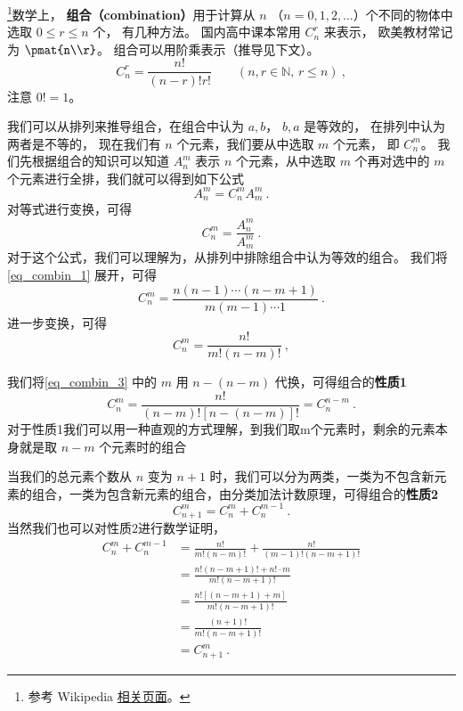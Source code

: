 
\begin{issues}
\issueDraft
\end{issues}


\footnote{参考 Wikipedia \href{https://en.wikipedia.org/wiki/Combination}{相关页面}。}数学上， \textbf{组合（combination）}用于计算从 $n$ （$n = 0, 1, 2, \dots$）个不同的物体中选取 $0 \leqslant r \leqslant n$ 个， 有几种方法。 国内高中课本常用 $C_n^r$ 来表示， 欧美教材常记为 $\pmat{n\\r}$。 组合可以用阶乘表示（推导见下文）。
\begin{equation}
C_n^r = \frac{n!}{(n-r)!r!} \qquad (n, r \in \mathbb N,\, r \leqslant n)~,
\end{equation}
注意 $0! = 1$。

我们可以从排列来推导组合，在组合中认为 ${a,b}$， ${b,a}$ 是等效的， 在排列中认为两者是不等的， 现在我们有 $n$ 个元素，我们要从中选取 $m$ 个元素， 即 $C_n^m$。
我们先根据组合的知识可以知道 $A_n^m$ 表示 $n$ 个元素，从中选取 $m$ 个再对选中的 $m$ 个元素进行全排，我们就可以得到如下公式
\begin{equation}
A_n^m = C_n^m A_m^m~.
\end{equation}
对等式进行变换，可得
\begin{equation}\label{eq_combin_1}
C_n^m = \frac{A_n^m}{A_m^m}~.
\end{equation}
对于这个公式，我们可以理解为，从排列中排除组合中认为等效的组合。
我们将\autoref{eq_combin_1} 展开，可得
\begin{equation}\label{eq_combin_2}
C_n^m = \frac{n(n - 1) \cdots (n - m + 1)}{m(m-1)\cdots 1}~.
\end{equation}
进一步变换，可得
\begin{equation}\label{eq_combin_3}
C_n^m = \frac{n!}{m!(n-m)!}~,
\end{equation}

我们将\autoref{eq_combin_3} 中的 $m$ 用 $n-(n-m)$ 代换，可得组合的\textbf{性质1}
\begin{equation}\label{eq_combin_4}
C_n^m = \frac{n!}{(n-m)![n-(n-m)]!} = C_n^{n-m}~.
\end{equation}
对于性质1我们可以用一种直观的方式理解，到我们取m个元素时，剩余的元素本身就是取 $n-m$ 个元素时的组合

当我们的总元素个数从 $n$ 变为 $n+1$ 时，我们可以分为两类，一类为不包含新元素的组合，一类为包含新元素的组合，由分类加法计数原理，可得组合的\textbf{性质2}
\begin{equation}
C_{n + 1}^m = C_n^m + C_n^{m - 1}~.
\end{equation}
当然我们也可以对性质2进行数学证明，
\begin{equation}
\begin{aligned}
C_n^m + C_n^{m - 1} &= \frac{n!}{m!(n-m)!} + \frac{n!}{(m - 1)!(n - m + 1)!}\\
&=\frac{n!(n - m + 1)! + n!\cdot m}{m!(n - m + 1)!}\\
&=\frac{n![(n - m + 1) + m]}{m!(n - m + 1)!}\\
&=\frac{(n + 1)!}{m!(n - m + 1)!}\\
&=C_{n+1}^m~.
\end{aligned}
\end{equation}